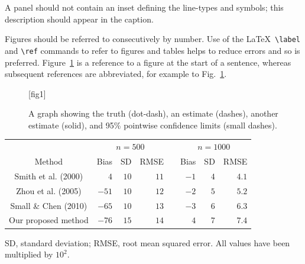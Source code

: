 \documentclass[lineno]{biometrika}
\def\Bka{{\it Biometrika}}
\begin{document}
A panel should not contain an inset defining the line-types and symbols; this description should appear in the caption.


Figures should be referred to consecutively by number. Use of the \LaTeX\ \verb+\label+ and \verb+\ref+ commands to refer to figures and tables helps to reduce errors and so is preferred.  Figure~\ref{fig1}  is a reference to a figure at the start of a sentence, whereas subsequent references are abbreviated, for example to Fig.~\ref{fig1}.

\begin{figure}
\figurebox{20pc}{25pc}{}[fig1]
\caption{A graph showing the truth (dot-dash), an estimate (dashes), another estimate (solid), and 95\% pointwise confidence limits (small dashes).}
\label{fig1}
\end{figure}

\begin{table}
{	\begin{tabular}{crrrcrrr}
		& \multicolumn{3}{c}{$n=500$} & &\multicolumn{3}{c}{$n=1000$} \\
		Method & Bias & SD & RMSE & &Bias & SD & RMSE \\ 
		Smith et al. (2000) & $4$ & $10$ & $11$& & $-1$ & $4$ & $4.1$\\ 
		Zhou et al. (2005) & $-51$ & $10$ & $12$ &&  $-2$ & $5$ & $5.2$\\ 
		Small \& Chen (2010) & $-65$ & $10$ & $13$ && $-3$ & $6$ & $6.3$\\ 
		Our proposed method & $-76$ & $15$ & $14$ && $4$ & $7$ & $7.4$\\ 
	\end{tabular}}
	\label{tablelabel}
	\begin{tabnote}
	SD, standard deviation; RMSE, root mean squared error. All values have been multiplied by $10^2$.
	\end{tabnote}
	\label{tab2}
\end{table}
\end{document}
